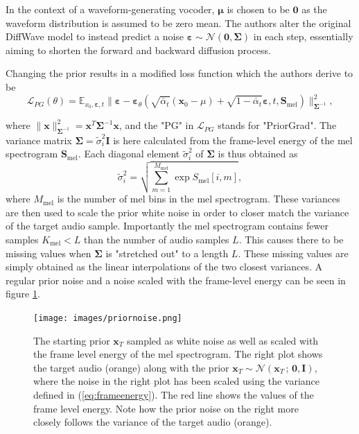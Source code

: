 \documentclass{report}
\begin{document}
In the context of a waveform-generating vocoder, $\bm{\mu}$ is chosen to be $\bm{0}$ as the waveform distribution is assumed to be zero mean. The authors alter the original DiffWave model to instead predict a noise $\bm{\varepsilon} \sim \mathcal{N}(\bm{0}, \bm{\Sigma})$ in each step, essentially aiming to shorten the forward and backward diffusion process.

Changing the prior results in a modified loss function which the authors derive to be
\begin{equation} \label{eq:priorloss}
    \mathcal{L}_{PG}(\theta) = \mathbb{E}_{x_0, \bm{\varepsilon}, t} \|\bm{\varepsilon} - \bm{\varepsilon}_{\theta}(\sqrt{\bar{\alpha}_t} (\textbf{x}_0-\mu) + \sqrt{1 - \bar{\alpha}_t} \bm{\varepsilon}, t, \bm{S}_{\text{mel}}) \|^2_{\bm{\Sigma}^{-1}},
\end{equation}

where $\|\bm{x} \|^2_{\bm{\Sigma}^{-1}} = \bm{x}^T \bm{\Sigma}^{-1} \bm{x}$, and the "PG" in $\mathcal{L}_{PG}$ stands for "PriorGrad". The variance matrix $\bm{\Sigma} = \tilde{\sigma}_i^2 \bm{I}$ is here calculated from the frame-level energy of the mel spectrogram $\bm{S}_{\text{mel}}$. Each diagonal element $\tilde{\sigma}_i^2$ of $\bm{\Sigma}$ is thus obtained as
\begin{equation} \label{eq:frameenergy}
    \tilde{\sigma}_i^2 = \sqrt{\sum_{m=1}^{M_{\text{mel}}} \exp{S_{\text{mel}}[i, m]}},
\end{equation}
where $M_{\text{mel}}$ is the number of mel bins in the mel spectrogram. These variances are then used to scale the prior white noise in order to closer match the variance of the target audio sample. Importantly the mel spectrogram contains fewer samples $K_{\text{mel}} < L$ than the number of audio samples $L$. This causes there to be missing values when $\bm{\Sigma}$ is "stretched out" to a length $L$. These missing values are simply obtained as the linear interpolations of the two closest variances. A regular prior noise and a noise scaled with the frame-level energy can be seen in figure \ref{fig:priornoise}.
\begin{figure}[H]
    \centering
    \texttt{[image: images/priornoise.png]}
    \caption{\onehalfspacing The starting prior $\bm{x}_T$ sampled as white noise as well as scaled with the frame level energy of the mel spectrogram. The right plot shows the target audio (orange) along with the prior $\bm{x}_T \sim \mathcal{N}(\bm{x}_T \, ; \, \bm{0}, \bm{I})$, where the noise in the right plot has been scaled using the variance defined in (\ref{eq:frameenergy}). The red line shows the values of the frame level energy. Note how the prior noise on the right more closely follows the variance of the target audio (orange).}
    \label{fig:priornoise}
\end{figure}
\end{document}
